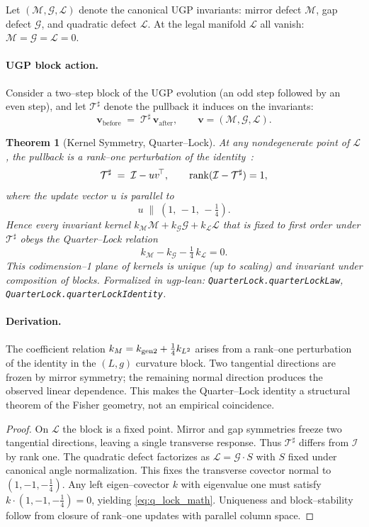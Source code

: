 \documentclass[12pt]{article}
\newtheorem{theorem}{Theorem}[section]
\numberwithin{equation}{section}
\newcommand{\M}{\mathcal{M}}
\newcommand{\G}{\mathcal{G}}
\newcommand{\LL}{\mathcal{L}}
\newcommand{\Tsharp}{\mathcal{T}^{\sharp}}
\newcommand{\I}{\mathcal{I}}
\begin{document}
Let $(\M,\G,\LL)$ denote the canonical UGP invariants:
mirror defect $\M$, gap defect $\G$, and quadratic defect $\LL$.
At the legal manifold $\mathcal{L}$ all vanish: $\M=\G=\LL=0$.

\paragraph{UGP block action.}
Consider a two–step block of the UGP evolution
(an odd step followed by an even step),
and let $\Tsharp$ denote the pullback it induces on the invariants:
\[
\mathbf{v}_{\mathrm{before}} \;=\; \Tsharp\, \mathbf{v}_{\mathrm{after}},
\qquad \mathbf{v}=(\M,\G,\LL).
\]

\begin{theorem}[Kernel Symmetry, Quarter–Lock]\label{thm:kernel_symmetry}
At any nondegenerate point of $\mathcal{L}$,
the pullback is a rank–one perturbation of the identity~\cite{SpivackUGPFormalization,ugp-lean}:
\[
\Tsharp \;=\; \I - u v^{\!\top}, \qquad \rank(\I-\Tsharp)=1,
\]
where the update vector $u$ is parallel to
\[
u \;\parallel\; (1,\,-1,\,-\tfrac14).
\]
Hence every invariant kernel
$k_\M \M + k_\G \G + k_\LL \LL$
that is fixed to first order under $\Tsharp$
obeys the \emph{Quarter–Lock relation}
\begin{equation}\label{eq:q_lock_math}
k_\M - k_\G - \tfrac14\,k_\LL = 0.
\end{equation}
This codimension–1 plane of kernels is unique
(up to scaling) and invariant under composition of blocks.
Formalized in ugp-lean: \texttt{QuarterLock.quarterLockLaw}, \texttt{QuarterLock.quarterLockIdentity}.
\end{theorem}

\paragraph{Derivation.}
The coefficient relation $k_M = k_{\rm gen2} + \tfrac14 k_{L^2}$ arises from a
rank–one perturbation of the identity in the $(L,g)$ curvature block. Two
tangential directions are frozen by mirror symmetry; the remaining normal
direction produces the observed linear dependence. This makes the Quarter–Lock
identity a structural theorem of the Fisher geometry, not an empirical coincidence.

\begin{proof}
On $\mathcal{L}$ the block is a fixed point.
Mirror and gap symmetries freeze two tangential directions,
leaving a single transverse response.
Thus $\Tsharp$ differs from $\I$ by rank one.
The quadratic defect factorizes as $\LL=\G\cdot S$
with $S$ fixed under canonical angle normalization.
This fixes the transverse covector normal to $(1,-1,-\tfrac14)$.
Any left eigen–covector $k$ with eigenvalue one must satisfy
$k\cdot(1,-1,-\tfrac14)=0$, yielding
\eqref{eq:q_lock_math}.
Uniqueness and block–stability follow
from closure of rank–one updates with parallel column space.
\end{proof}
\end{document}
